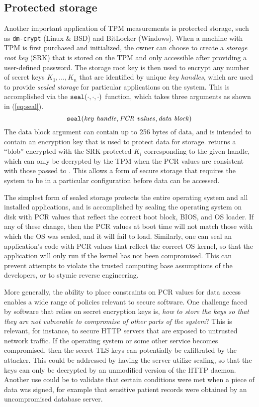 \documentclass[11pt,twoside]{scrartcl}
\begin{document}
\subsection{Protected storage}

Another important application of TPM measurements is protected storage, such as \verb'dm-crypt' (Linux \& BSD) and BitLocker (Windows). When a machine with TPM is first purchased and initialized, the owner can choose to create a \emph{storage root key} (SRK) \sk{\store} that is stored on the TPM and only accessible after providing a user-defined password. The storage root key is then used to encrypt any number of secret keys $K_1, \ldots, K_n$ that are identified by unique \emph{key handles}, which are used to provide \emph{sealed storage} for particular applications on the system. This is accomplished via the $\texttt{\upshape seal}(\cdot,\cdot,\cdot)$ function, which takes three arguments as shown in (\ref{eq:seal}).
\begin{equation}
\label{eq:seal}
\seal{\mathit{key~handle}}{\mathit{PCR~values}}{\mathit{data~block}}
\end{equation}
The data block argument can contain up to 256 bytes of data, and is intended to contain an encryption key that is used to protect data for storage.  returns a ``blob'' encrypted with the SRK-protected $K_i$ corresponding to the given handle, which can only be decrypted by the TPM when the PCR values are consistent with those passed to . This allows a form of secure storage that requires the system to be in a particular configuration before data can be accessed.

The simplest form of sealed storage protects the entire operating system and all installed applications, and is accomplished by sealing the operating system on disk with PCR values that reflect the correct boot block, BIOS, and OS loader. If any of these change, then the PCR values at boot time will not match those with which the OS was sealed, and it will fail to load. Similarly, one can seal an application's code with PCR values that reflect the correct OS kernel, so that the application will only run if the kernel has not been compromised. This can prevent attempts to violate the trusted computing base assumptions of the developers, or to stymie reverse engineering.

More generally, the ability to place constraints on PCR values for data access enables a wide range of policies relevant to secure software. One challenge faced by software that relies on secret encryption keys is, \emph{how to store the keys so that they are not vulnerable to compromise of other parts of the system}? This is relevant, for instance, to secure HTTP servers that are exposed to untrusted network traffic. If the operating system or some other service becomes compromised, then the secret TLS keys can potentially be exfiltrated by the attacker. This could be addressed by having the server utilize sealing, so that the keys can only be decrypted by an unmodified version of the HTTP daemon. Another use could be to validate that certain conditions were met when a piece of data was signed, for example that sensitive patient records were obtained by an uncompromised database server.
\end{document}
